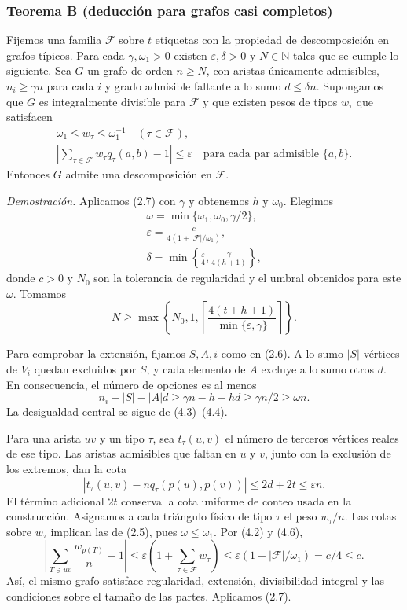 \documentclass[spanish,11pt,a4paper]{article}
\begin{document}
\subsubsection{Teorema B (deducción para grafos casi completos)}\label{teorema-b-deducciuxf3n-para-grafos-casi-completos}

Fijemos una familia \(\mathcal F\) sobre \(t\) etiquetas con la propiedad de descomposición en grafos típicos. Para cada \(\gamma,\omega_1>0\) existen \(\varepsilon,\delta>0\) y \(N\in\mathbb N\) tales que se cumple lo siguiente. Sea \(G\) un grafo de orden \(n\ge N\), con aristas únicamente admisibles, \(n_i\ge\gamma n\) para cada \(i\) y grado admisible faltante a lo sumo \(d\le\delta n\). Supongamos que \(G\) es integralmente divisible para \(\mathcal F\) y que existen pesos de tipos \(w_\tau\) que satisfacen \[\begin{gathered}
\omega_1\le w_\tau\le\omega_1^{-1}\quad(\tau\in\mathcal F),\\
\left|\sum_{\tau\in\mathcal F}w_\tau q_\tau(a,b)-1\right|\le\varepsilon
\quad\text{para cada par admisible }\{a,b\}.
\end{gathered}
\tag{4.2}\] Entonces \(G\) admite una descomposición en \(\mathcal F\).

\emph{Demostración.} Aplicamos (2.7) con \(\gamma\) y obtenemos \(h\) y \(\omega_0\). Elegimos \[\begin{gathered}
\omega=\min\{\omega_1,\omega_0,\gamma/2\},\\
\varepsilon=\frac{c}{4(1+|\mathcal F|/\omega_1)},\\
\delta=\min\left\{\frac\varepsilon4,\frac\gamma{4(h+1)}\right\},
\end{gathered}
\tag{4.3}\] donde \(c>0\) y \(N_0\) son la tolerancia de regularidad y el umbral obtenidos para este \(\omega\). Tomamos \[N\ge\max\left\{N_0,1,
\left\lceil\frac{4(t+h+1)}{\min\{\varepsilon,\gamma\}}\right\rceil\right\}.
\tag{4.4}\]

Para comprobar la extensión, fijamos \(S,A,i\) como en (2.6). A lo sumo \(|S|\) vértices de \(V_i\) quedan excluidos por \(S\), y cada elemento de \(A\) excluye a lo sumo otros \(d\). En consecuencia, el número de opciones es al menos \[n_i-|S|-|A|d\ge\gamma n-h-hd\ge\gamma n/2\ge\omega n.
\tag{4.5}\] La desigualdad central se sigue de (4.3)--(4.4).

Para una arista \(uv\) y un tipo \(\tau\), sea \(t_\tau(u,v)\) el número de terceros vértices reales de ese tipo. Las aristas admisibles que faltan en \(u\) y \(v\), junto con la exclusión de los extremos, dan la cota \[|t_\tau(u,v)-nq_\tau(p(u),p(v))|\le2d+2t\le\varepsilon n.
\tag{4.6}\] El término adicional \(2t\) conserva la cota uniforme de conteo usada en la construcción. Asignamos a cada triángulo físico de tipo \(\tau\) el peso \(w_\tau/n\). Las cotas sobre \(w_\tau\) implican las de (2.5), pues \(\omega\le\omega_1\). Por (4.2) y (4.6), \[\left|\sum_{T\ni uv}\frac{w_{p(T)}}n-1\right|
\le\varepsilon\left(1+\sum_{\tau\in\mathcal F}w_\tau\right)
\le\varepsilon(1+|\mathcal F|/\omega_1)=c/4\le c.
\tag{4.7}\] Así, el mismo grafo satisface regularidad, extensión, divisibilidad integral y las condiciones sobre el tamaño de las partes. Aplicamos (2.7).
\end{document}
